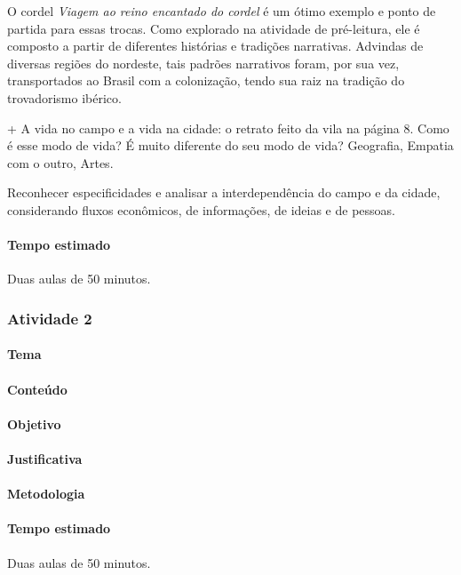 \documentclass[11pt]{extarticle}
\begin{document}
O cordel \textit{Viagem ao reino encantado do cordel} é um ótimo exemplo e ponto de partida para essas trocas. Como explorado na atividade de pré-leitura, ele é composto a partir de diferentes histórias e tradições narrativas. Advindas de diversas regiões do nordeste, tais padrões narrativos foram, por sua vez, transportados ao Brasil com a colonização, tendo sua raiz na tradição do trovadorismo ibérico.

+ A vida no campo e a vida na cidade: o retrato feito da vila na página 8. Como é esse modo de vida? É muito diferente do seu modo de vida? Geografia, Empatia com o outro, Artes.

Reconhecer especificidades e analisar a interdependência do campo e da cidade, considerando fluxos econômicos, de informações, de ideias e de pessoas.


\paragraph{Tempo estimado} Duas aulas de 50 minutos.


\subsubsection{Atividade 2}


\paragraph{Tema}

\paragraph{Conteúdo}

\paragraph{Objetivo}

\paragraph{Justificativa}

\paragraph{Metodologia}

\paragraph{Tempo estimado} Duas aulas de 50 minutos.
\end{document}
